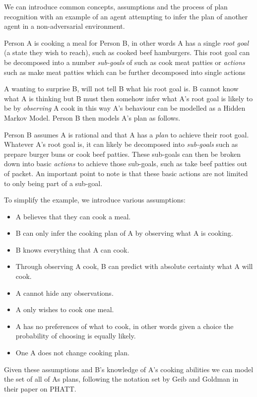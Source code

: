 \documentclass[parskip]{cs4rep}
\begin{document}
We can introduce common concepts, assumptions and the process of plan recognition with an example of an agent attempting to infer the plan of another agent in a non-adversarial environment. 

Person A is cooking a meal for Person B, in other words A has a single \textit{root goal} (a state they wish to reach), such as cooked beef hamburgers. This root goal can be decomposed into a number \textit{sub-goals} of such as cook meat patties or \textit{actions} such as make meat patties  which can be further decomposed into single actions

A wanting to surprise B, will not tell B what his root goal is. B cannot know what A is thinking but B must then somehow infer what A's root goal is likely to be by \textit{observing} A cook in this way A's behaviour can be modelled as a Hidden Markov Model. Person B then models A's plan as follows. 

Person B assumes A is rational and that A has a \textit{plan} to achieve their root goal. Whatever A's root goal is, it can likely be decomposed into \textit{sub-goals} such as prepare burger buns or cook beef patties. These sub-goals can then be broken down into basic \textit{actions} to achieve those sub-goals, such as take beef patties out of packet. An important point to note is that these basic actions are not limited to only being part of a sub-goal.

To simplify the example, we introduce various assumptions:

\begin{itemize}
\item
A believes that they can cook a meal.
\item
B can only infer the cooking plan of A by observing what A is cooking.
\item
B knows everything that A can cook.
\item
Through observing A cook, B can predict with absolute certainty what A will cook.
\item
A cannot hide any observations.
\item
A only wishes to cook one meal.
\item
A has no preferences of what to cook, in other words given a choice the probability of choosing is equally likely.
\item
One A does not change cooking plan.
\end{itemize}

Given these assumptions and B's knowledge of A's cooking abilities we can model the set of all of As plans, following the notation set by Geib and Goldman in their paper on PHATT.
\end{document}
